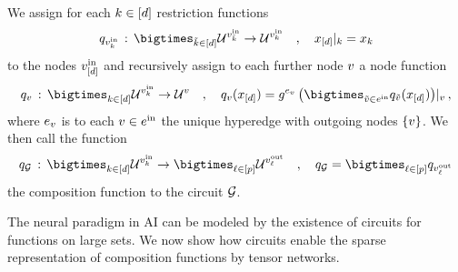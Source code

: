 \begin{definition}
\begin{itemize}
    \end{itemize}
    We assign for each $k\in[d]$ restriction functions
    \begin{align*}
        \exfunctionof{\node^{\insymbol}_\catenumerator}
        \defcols \bigtimes_{\seccatenumerator\in[\catorder]} \arbsetof{\node^{\insymbol}_{\seccatenumerator}} \rightarrow \arbsetof{\node^{\insymbol}_\catenumerator}
        \quad,\quad  \restrictionofto{\catindexof{[\catorder]}}{\catenumerator} = \catindexof{\catenumerator}
    \end{align*}
    to the nodes $v^{\mathrm{in}}_{[d]}$ and recursively assign to each further node $v$ a node function %
    \begin{align*}
        \exfunctionof{\node} \wcols \bigtimes_{\catenumeratorin} \arbsetof{\node^{\insymbol}_\catenumerator} \rightarrow \arbsetof{\node}
        \quad,\quad
        \exfunctionof{\node}(\catindexof{[\catorder]})
        = \restrictionofto{\secexfunctionof{\edge_\node}
        \left(
            \bigtimes_{\secnode\in\incomingnodes}\exfunctionof{\secnode}(\catindexof{[\catorder]})
        \right)}{\node} \, ,
    \end{align*}
    where $e_{v}$ is to each $v\in e^{\mathrm{in}}$ the unique hyperedge with outgoing nodes $\{v\}$.
    We then call the function
    \begin{align*}
        \exfunctionof{\graph} \wcols \bigtimes_{\catenumeratorin} \arbsetof{\node^{\insymbol}_\catenumerator} \rightarrow \bigtimes_{\selindexin} \arbsetof{\node^{\outsymbol}_\selindex}
        \quad,\quad
        \exfunctionof{\graph} = \bigtimes_{\selindexin} \exfunctionof{\node^{\outsymbol}_\selindex}
    \end{align*}
    the composition function to the circuit $\mathcal{G}$.
\end{definition}

The neural paradigm in AI can be modeled by the existence of circuits for functions on large sets.
We now show how circuits enable the sparse representation of composition functions by tensor networks.

